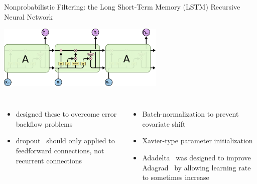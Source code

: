 \documentclass[aspectratio=169,19pt,xetex,handout]{beamer}
\begin{document}
\begin{frame}{Nonprobabilistic Filtering: the Long Short-Term Memory (LSTM) Recursive Neural Network}

\begin{center}
\includegraphics[width=0.6\textwidth]{lstm_chain}
\end{center}

\vspace{-20pt}

\begin{columns}
\begin{itemize}
    \item designed these to overcome error backflow problems~\cite{Hoc97}
    \item dropout~\cite{Sri14} should only applied to feedforward connections, not recurrent connections~\cite{Pha14, Zar14}
\end{itemize}

\begin{itemize}
    \item Batch-normalization to prevent covariate shift~\cite{Iof15}
    \item Xavier-type parameter initialization~\cite{Glo10}
    \item Adadelta~\cite{Zei12} was designed to improve Adagrad~\cite{Duc11} by allowing learning rate to sometimes increase
\end{itemize}

\end{columns}

\end{frame}
\end{document}
